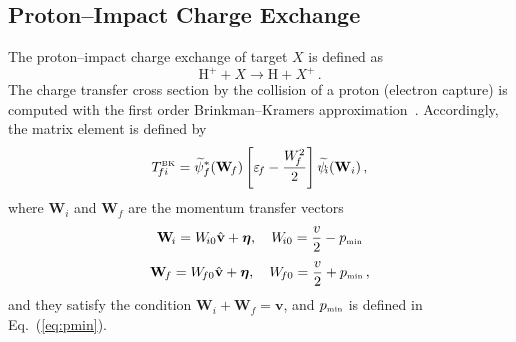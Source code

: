 \documentclass[10pt]{article}
\begin{document}
\subsection{Proton--Impact Charge Exchange}

The proton--impact charge exchange of target $X$ is defined as
\begin{equation}
 \mbox{H}^+ + X \rightarrow \mbox{H} + X^+\,.
\end{equation}
The charge transfer cross section by the collision of a proton 
(electron capture) is 
computed with the first order Brinkman--Kramers 
approximation~\cite{Brinkman1930}. 
Accordingly, the matrix element is defined by 
\begin{equation}
 T_{\!fi}^{\mbox{\tiny BK}} = \widetilde{\psi}_f^*(\mathbf{W}_{\!f})
 \left[\varepsilon_{\!f}-\frac{W_{\!f}^2}{2} \right]
 \widetilde{\psi}_{\!i}(\mathbf{W}_i)\,,
\end{equation}
where $\mathbf{W}_{\!i}$ and $\mathbf{W}_{\!f}$ are the momentum transfer 
vectors 
\begin{equation}
 \mathbf{W}_{\!i} = W_{\!i0} \hat{\mathbf{v}} + \boldsymbol{\eta}, \quad 
 W_{\!i0} = \frac{v}{2} - p_{\mbox{\tiny min}}
 \label{eq:momtransfi0}
\end{equation}
\begin{equation}
 \mathbf{W}_{\!f} = W_{\!f0} \hat{\mathbf{v}} + \boldsymbol{\eta}, \quad 
 W_{\!f0} = \frac{v}{2} + p_{\mbox{\tiny min}}\,,
 \label{eq:momtransff0}
\end{equation}
and they satisfy the condition $\mathbf{W}_{\!i}+\mathbf{W}_{\!f}=\mathbf{v}$,
and $p_{\mbox{\tiny min}}$ is defined in Eq.~(\ref{eq:pmin}).
\end{document}
